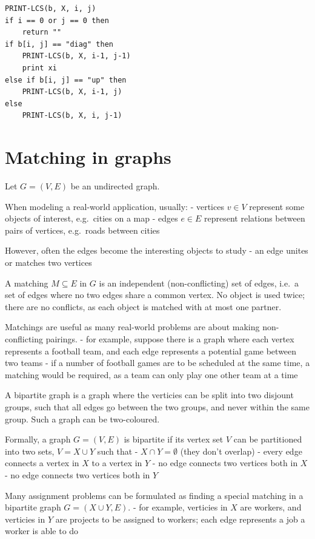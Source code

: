 \documentclass[11pt]{article}
\begin{document}
\begin{verbatim}
PRINT-LCS(b, X, i, j)
if i == 0 or j == 0 then
    return ""
if b[i, j] == "diag" then
    PRINT-LCS(b, X, i-1, j-1)
    print xi
else if b[i, j] == "up" then
    PRINT-LCS(b, X, i-1, j)
else
    PRINT-LCS(b, X, i, j-1)
\end{verbatim}

    \section{Matching in graphs}\label{matching-in-graphs}

Let \(G = (V, E)\) be an undirected graph.

When modeling a real-world application, usually: - vertices \(v \in V\)
represent some objects of interest, e.g.~cities on a map - edges
\(e \in E\) represent relations between pairs of vertices, e.g.~roads
between cities

However, often the edges become the interesting objects to study - an
edge unites or matches two vertices

A matching \(M \subseteq E\) in \(G\) is an independent
(non-conflicting) set of edges, i.e.~a set of edges where no two edges
share a common vertex. No object is used twice; there are no conflicts,
as each object is matched with at most one partner.

Matchings are useful as many real-world problems are about making
non-conflicting pairings. - for example, suppose there is a graph where
each vertex represents a football team, and each edge represents a
potential game between two teams - if a number of football games are to
be scheduled at the same time, a matching would be required, as a team
can only play one other team at a time

A bipartite graph is a graph where the verticies can be split into two
disjount groups, such that all edges go between the two groups, and
never within the same group. Such a graph can be two-coloured.

Formally, a graph \(G=(V,E)\) is bipartite if its vertex set \(V\) can
be partitioned into two sets, \(V = X \cup Y\) such that -
\(X \cap Y = \emptyset\) (they don't overlap) - every edge connects a
vertex in \(X\) to a vertex in \(Y\) - no edge connects two vertices
both in \(X\) - no edge connects two vertices both in \(Y\)

Many assignment problems can be formulated as finding a special matching
in a bipartite graph \(G = (X \cup Y, E)\). - for example, verticies in
\(X\) are workers, and verticies in \(Y\) are projects to be assigned to
workers; each edge represents a job a worker is able to do
\end{document}
